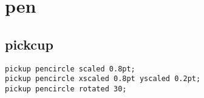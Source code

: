 \section{pen}
\subsection{pickcup}
\begin{lstlisting}[language=Tex]
pickup pencircle scaled 0.8pt;
pickup pencircle xscaled 0.8pt yscaled 0.2pt;
pickup pencircle rotated 30;
\end{lstlisting}
